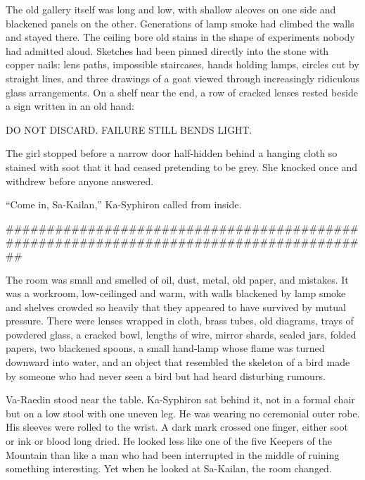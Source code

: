 The old gallery itself was long and low, with shallow alcoves on one side and blackened panels on the other. 
Generations of lamp smoke had climbed the walls and stayed there. 
The ceiling bore old stains in the shape of experiments nobody had admitted aloud. 
Sketches had been pinned directly into the stone with copper nails: lens paths, impossible staircases, hands holding lamps, circles cut by straight lines, and three drawings of a goat viewed through increasingly ridiculous glass arrangements. 
On a shelf near the end, a row of cracked lenses rested beside a sign written in an old hand:\par

\begin{scripture}
DO NOT DISCARD. FAILURE STILL BENDS LIGHT.
\end{scripture}

The girl stopped before a narrow door half-hidden behind a hanging cloth so stained with soot that it had ceased pretending to be grey. 
She knocked once and withdrew before anyone answered.\par

“Come in, Sa-Kailan,” Ka-Syphiron called from inside.\par

########################################################################################

The room was small and smelled of oil, dust, metal, old paper, and mistakes.
It was a workroom, low-ceilinged and warm, with walls blackened by lamp smoke and shelves crowded so heavily that they appeared to have survived by mutual pressure. 
There were lenses wrapped in cloth, brass tubes, old diagrams, trays of powdered glass, a cracked bowl, lengths of wire, mirror shards, sealed jars, folded papers, two blackened spoons, 
a small hand-lamp whose flame was turned downward into water, and an object that resembled the skeleton of a bird made by someone who had never seen a bird but had heard disturbing rumours.\par

Va-Raedin stood near the table. 
Ka-Syphiron sat behind it, not in a formal chair but on a low stool with one uneven leg. 
He was wearing no ceremonial outer robe. 
His sleeves were rolled to the wrist. 
A dark mark crossed one finger, either soot or ink or blood long dried. He looked less like one of the five Keepers of the Mountain than like a man who had been interrupted in the middle of ruining something interesting.
Yet when he looked at Sa-Kailan, the room changed.\par

